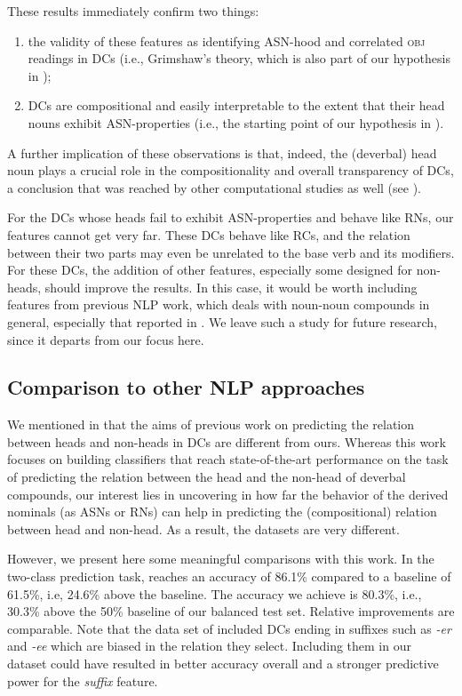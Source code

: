 \documentclass[output=paper]{langsci/langscibook}
\begin{document}
These results immediately confirm two things: 
\begin{enumerate}
\item the validity of these features as identifying ASN-hood and correlated \textsc{obj} readings in DCs (i.e., Grimshaw's theory, which is also part of our hypothesis in ); 
\item DCs are compositional and easily interpretable to the extent that their head nouns exhibit ASN-properties (i.e., the starting point of our hypothesis in ). 
\end{enumerate} A further implication of these observations is that, indeed, the (deverbal) head noun  plays a crucial role in the compositionality  {and overall} transparency of DCs, a conclusion that was reached by other computational studies as well (see ). 

For the DCs whose heads fail to exhibit ASN-properties and behave like RNs, our features cannot get very far.  {These DCs behave like RCs, and the relation between their two parts may even be unrelated to the base verb and its modifiers.} For these DCs, the addition of other features, especially some designed for non-heads, should improve the results. In this case, it would be worth including features from previous NLP work, which deals with noun-noun compounds in general, especially that reported in . 
 {We leave such a study for future research, since it departs from our focus here.}


\subsection{Comparison to other NLP approaches}\label{sec:gia:discussion-comparison}

We mentioned in  that the aims of previous work on predicting the relation between heads and non-heads in DCs are  different from ours. Whereas this work focuses on building classifiers that reach state-of-the-art performance on the task of predicting the relation between the head and the non-head of deverbal compounds, our interest lies in uncovering in how far the behavior of the derived nominals (as ASNs or RNs) can help in predicting the (compositional) relation between head and non-head. As a result, the datasets are very different. 

However, we present here some meaningful comparisons with  this work. In the two-class prediction task, \cite{lapata:02} reaches an accuracy of 86.1\% compared to a baseline of 61.5\%, i.e, 24.6\% above the baseline. The accuracy we achieve is 80.3\%, i.e., 30.3\% above the 50\% baseline of our balanced test set. Relative improvements are comparable. Note that the data set of \cite{lapata:02} included DCs ending in suffixes such as \textit{-er} and  \textit{-ee} which are  biased in the relation they select. Including them in our dataset could have resulted in better accuracy overall and a stronger predictive power for the \textit{suffix} feature. 
\end{document}
